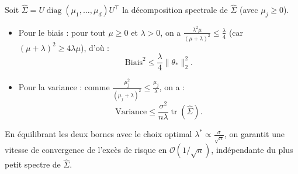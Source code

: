 \begin{proposition}
    Soit $\hat{\Sigma} = U \operatorname{diag}(\mu_1, \dots, \mu_d) U^\top$ la décomposition spectrale de $\hat{\Sigma}$ (avec $\mu_j \ge 0$).
    \begin{itemize}
        \item Pour le biais : pour tout $\mu \ge 0$ et $\lambda > 0$, on a $\frac{\lambda^2 \mu}{(\mu + \lambda)^2} \le \frac{\lambda}{4}$ (car $(\mu+\lambda)^2 \ge 4\lambda\mu$), d'où :
        \begin{equation}
            \text{Biais}^2 \le \frac{\lambda}{4} \|\theta_*\|_2^2.
        \end{equation}
        \item Pour la variance : comme $\frac{\mu_j^2}{(\mu_j + \lambda)^2} \le \frac{\mu_j}{\lambda}$, on a :
        \begin{equation}
            \text{Variance} \le \frac{\sigma^2}{n \lambda} \operatorname{tr}(\hat{\Sigma}).
        \end{equation}
    \end{itemize}
    En équilibrant les deux bornes avec le choix optimal $\lambda^* \propto \frac{\sigma}{\sqrt{n}}$, on garantit une vitesse de convergence de l'excès de risque en $\mathcal{O}(1/\sqrt{n})$, indépendante du plus petit spectre de $\hat{\Sigma}$.
\end{proposition}